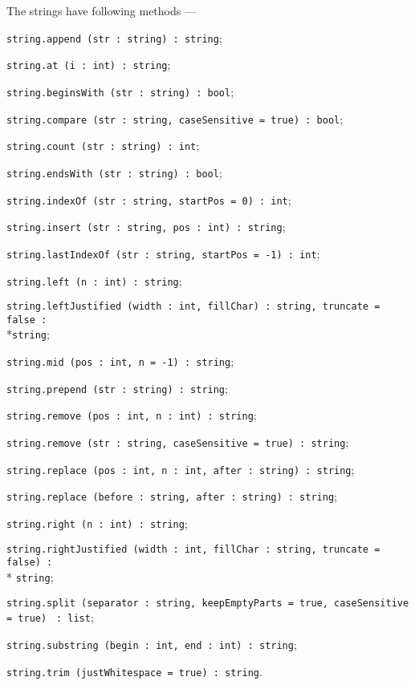 The strings have following methods —
\begin{icItems}
	\item
	\texttt{string.append (str : string) : string};
	\item
	\texttt{string.at (i : int) : string};
	\item
	\texttt{string.beginsWith (str : string) : bool};
	\item
	\texttt{string.compare (str : string, caseSensitive = true) : bool};
	\item
	\texttt{string.count (str : string) : int};
	\item
	\texttt{string.endsWith (str : string) : bool};
	\item
	\texttt{string.indexOf (str : string, startPos = 0) : int};
	\item
	\texttt{string.insert (str : string, pos : int) : string};
	\item
	\texttt{string.lastIndexOf (str : string, startPos = -1) : int};
	\item
	\texttt{string.left (n : int) : string};
	\item
	\texttt{string.leftJustified (width : int, fillChar) : string, truncate = false :}\\*\texttt{string};
	\item
	\texttt{string.mid (pos : int, n = -1) : string};
	\item
	\texttt{string.prepend (str : string) : string};
	\item
	\texttt{string.remove (pos : int, n : int) : string};
	\item
	\texttt{string.remove (str : string, caseSensitive = true) : string};
	\item
	\texttt{string.replace (pos : int, n : int, after : string) : string};
	\item
	\texttt{string.replace (before : string, after : string) : string};
	\item
	\texttt{string.right (n : int) : string};
	\item
	\texttt{string.rightJustified (width : int, fillChar : string, truncate = false) :}\\* \texttt{string};
	\item
	\texttt{string.split (separator : string, keepEmptyParts = true, caseSensitive = true) } \texttt{: list};
	\item
	\texttt{string.substring (begin : int, end : int) : string};
	\item
	\texttt{string.trim (justWhitespace = true) : string}.
\end{icItems}

